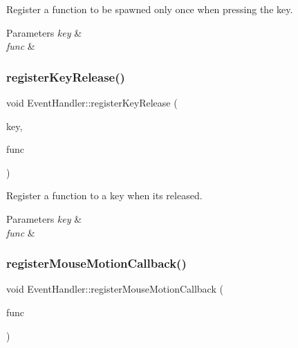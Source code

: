 Register a function to be spawned only once when pressing the key. 


\begin{DoxyParams}{Parameters}
{\em key} & \\
\hline
{\em func} & \\
\hline
\end{DoxyParams}
\mbox{\label{classEventHandler_ae14254f56ab16e81bd4109afcabf9b9a}} 
\subsubsection{\texorpdfstring{registerKeyRelease()}{registerKeyRelease()}}
{\footnotesize\ttfamily void Event\+Handler\+::register\+Key\+Release (\begin{DoxyParamCaption}\item[{S\+D\+L\+\_\+\+Scancode}]{key,  }\item[{callback}]{func }\end{DoxyParamCaption})}



Register a function to a key when it\textquotesingle{}s released. 


\begin{DoxyParams}{Parameters}
{\em key} & \\
\hline
{\em func} & \\
\hline
\end{DoxyParams}
\mbox{\label{classEventHandler_a2418d37f4ced90f61e72e84338b069cb}} 
\subsubsection{\texorpdfstring{registerMouseMotionCallback()}{registerMouseMotionCallback()}}
{\footnotesize\ttfamily void Event\+Handler\+::register\+Mouse\+Motion\+Callback (\begin{DoxyParamCaption}\item[{callback}]{func }\end{DoxyParamCaption})}



